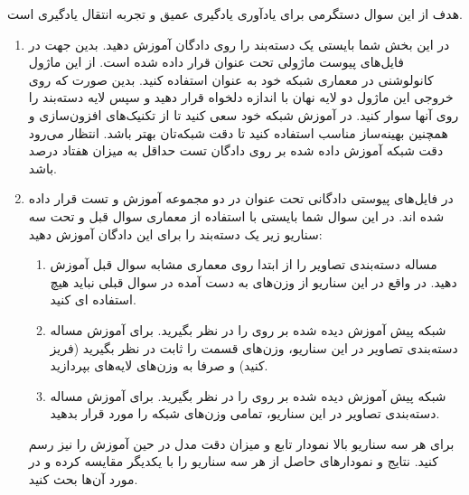 \documentclass{article}
\begin{document}
هدف از این سوال دستگرمی برای یادآوری یادگیری عمیق و تجربه انتقال یادگیری است.
\begin{enumerate}
\item
در این بخش شما بایستی یک دسته‌بند را روی دادگان
آموزش دهید.
بدین جهت در فایل‌های پیوست ماژولی تحت عنوان 
قرار داده شده است. از این ماژول کانولوشنی در معماری شبکه خود به عنوان 
استفاده کنید. بدین صورت که روی خروجی این ماژول دو لایه نهان 
با اندازه دلخواه قرار دهید و سپس لایه دسته‌بند را روی آنها سوار کنید.
در آموزش شبکه خود سعی کنید تا از تکنیک‌های افزون‌سازی و همچنین بهینه‌ساز مناسب استفاده کنید تا دقت شبکه‌تان بهتر باشد. انتظار می‌رود دقت شبکه‌ آموزش داده شده بر روی دادگان تست 
حداقل به میزان هفتاد درصد باشد.

\item
در فایل‌های پیوستی دادگانی تحت عنوان 
در دو مجموعه آموزش و تست قرار داده شده اند. در این سوال شما بایستی با استفاده از معماری سوال قبل و تحت سه سناریو زیر یک دسته‌بند را برای این دادگان آموزش دهید:

\begin{enumerate}
\item
مساله دسته‌بندی تصاویر 
را از ابتدا روی معماری مشابه سوال قبل آموزش دهید. در واقع در این سناریو از وزن‌های به دست آمده در سوال قبلی نباید هیچ استفاده ای کنید.

\item
شبکه پیش آموزش دیده شده بر روی 
را در نظر بگیرید. برای آموزش مساله دسته‌بندی تصاویر
در این سناریو، وزن‌های قسمت
را ثابت در نظر بگیرید (فریز کنید) و صرفا به 
 وزن‌های لایه‌های
بپردازید.

\item
شبکه پیش آموزش دیده شده بر روی 
را در نظر بگیرید. برای آموزش مساله دسته‌بندی تصاویر
در این سناریو، تمامی وزن‌های شبکه را مورد
  قرار بدهید.

\end{enumerate}
برای هر سه سناریو بالا نمودار تابع
و میزان دقت مدل در حین آموزش را نیز رسم کنید. نتایج و نمودار‌های حاصل از هر سه سناریو را با یکدیگر مقایسه کرده و در مورد آن‌ها بحث کنید.

\end{enumerate}


\end{document}
